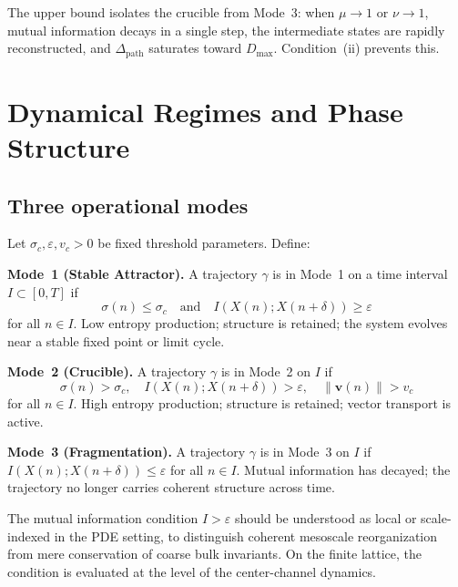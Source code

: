 \documentclass[12pt, oneside]{memoir}
\newcommand{\Dpth}{\Delta_{\mathrm{path}}}
\newcommand{\nnorm}[1]{\lVert #1 \rVert}
\newcommand{\bv}{\mathbf{v}}
\begin{document}
The upper bound isolates the crucible from Mode~3: when $\mu \to 1$ or $\nu \to 1$,
mutual information decays in a single step, the intermediate states are rapidly
reconstructed, and $\Dpth$ saturates toward $D_{\max}$.  Condition~(ii) prevents this.

\chapter{Dynamical Regimes and Phase Structure}
\label{ch:modes}

\section{Three operational modes}

\begin{definition}
\label{def:modes}
Let $\sigma_c, \varepsilon, v_c > 0$ be fixed threshold parameters.  Define:

\medskip
\noindent\textbf{Mode~1 (Stable Attractor).} A trajectory $\gamma$ is in Mode~1 on a
time interval $I \subset [0,T]$ if
\[
  \sigma(n) \le \sigma_c \quad \text{and} \quad
  I(X(n); X(n+\delta)) \ge \varepsilon
\]
for all $n \in I$.  Low entropy production; structure is retained; the system evolves
near a stable fixed point or limit cycle.

\medskip
\noindent\textbf{Mode~2 (Crucible).} A trajectory $\gamma$ is in Mode~2 on $I$ if
\[
  \sigma(n) > \sigma_c, \quad
  I(X(n); X(n+\delta)) > \varepsilon, \quad
  \nnorm{\bv(n)} > v_c
\]
for all $n \in I$.  High entropy production; structure is retained; vector transport is
active.

\medskip
\noindent\textbf{Mode~3 (Fragmentation).} A trajectory $\gamma$ is in Mode~3 on $I$ if
$I(X(n); X(n+\delta)) \le \varepsilon$ for all $n \in I$.  Mutual information has
decayed; the trajectory no longer carries coherent structure across time.
\end{definition}

\begin{remark}
The mutual information condition $I > \varepsilon$ should be understood as local or
scale-indexed in the PDE setting, to distinguish coherent mesoscale reorganization from
mere conservation of coarse bulk invariants.  On the finite lattice, the condition is
evaluated at the level of the center-channel dynamics.
\end{remark}
\end{document}
